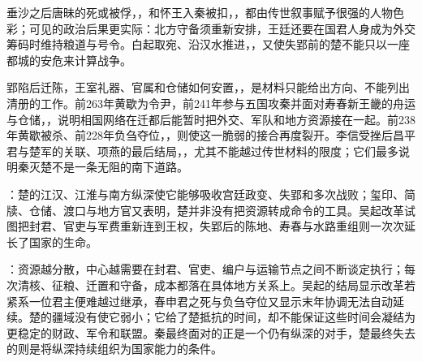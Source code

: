 垂沙之后唐昧的死或被俘，，和怀王入秦被扣，，都由传世叙事赋予很强的人物色彩；可见的政治后果更实际：北方守备须重新安排，王廷还要在国君人身成为外交筹码时维持粮道与号令。白起取宛、沿汉水推进，，又使失郢前的楚不能只以一座都城的安危来计算战争。

郢陷后迁陈，王室礼器、官属和仓储如何安置，，是材料只能给出方向、不能列出清册的工作。前263年黄歇为令尹，前241年参与五国攻秦并面对寿春新王畿的舟运与仓储，，说明相国网络在迁都后能暂时把外交、军队和地方资源接在一起。前238年黄歇被杀、前228年负刍夺位，，则使这一脆弱的接合再度裂开。李信受挫后昌平君与楚军的关联、项燕的最后结局，，尤其不能越过传世材料的限度；它们最多说明秦灭楚不是一条无阻的南下道路。

\begin{turningpoint}
：楚的江汉、江淮与南方纵深使它能够吸收宫廷政变、失郢和多次战败；玺印、简牍、仓储、渡口与地方官又表明，楚并非没有把资源转成命令的工具。吴起改革试图把封君、官吏与军费重新连到王权，失郢后的陈地、寿春与水路重组则一次次延长了国家的生命。

：资源越分散，中心越需要在封君、官吏、编户与运输节点之间不断谈定执行；每次清核、征粮、迁置和守备，成本都落在具体地方关系上。吴起的结局显示改革若紧系一位君主便难越过继承，春申君之死与负刍夺位又显示末年协调无法自动延续。楚的疆域没有使它弱小；它给了楚抵抗的时间，却不能保证这些时间会凝结为更稳定的财政、军令和联盟。秦最终面对的正是一个仍有纵深的对手，楚最终失去的则是将纵深持续组织为国家能力的条件。
\end{turningpoint}
